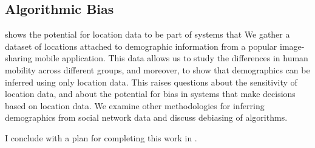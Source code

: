 \subsection{Algorithmic Bias}
 shows the potential for location data to be part of systems that %
We gather a dataset of locations attached to demographic information from a popular image-sharing mobile application.
This data allows us to study the differences in human mobility across different groups, and moreover, to show that demographics can be inferred using only location data.
This raises questions about the sensitivity of location data, and about the potential for bias in systems that make decisions based on location data.
We examine other methodologies for inferring demographics from social network data and discuss debiasing of algorithms.



I conclude with a plan for completing this work in .

